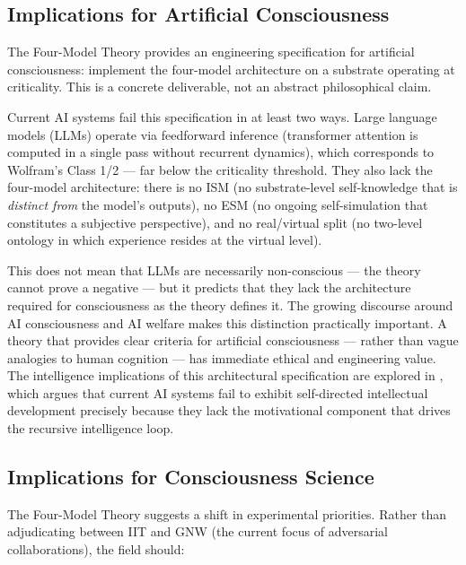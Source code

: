 \documentclass[12pt]{article}
\begin{document}
\subsection{Implications for Artificial Consciousness}


The Four-Model Theory provides an engineering specification for artificial consciousness: implement the four-model architecture on a substrate operating at criticality. This is a concrete deliverable, not an abstract philosophical claim.

Current AI systems fail this specification in at least two ways. Large language models (LLMs) operate via feedforward inference (transformer attention is computed in a single pass without recurrent dynamics), which corresponds to Wolfram's Class 1/2 --- far below the criticality threshold. They also lack the four-model architecture: there is no ISM (no substrate-level self-knowledge that is \emph{distinct from} the model's outputs), no ESM (no ongoing self-simulation that constitutes a subjective perspective), and no real/virtual split (no two-level ontology in which experience resides at the virtual level).

This does not mean that LLMs are necessarily non-conscious --- the theory cannot prove a negative --- but it predicts that they lack the architecture required for consciousness as the theory defines it. The growing discourse around AI consciousness \citep{Butlin2023,Butlin2025,Schwitzgebel2025,Birch2025} and AI welfare \citep{Long2024,Anthropic2025} makes this distinction practically important. A theory that provides clear criteria for artificial consciousness --- rather than vague analogies to human cognition --- has immediate ethical and engineering value. The intelligence implications of this architectural specification are explored in \citet{Gruber2026a}, which argues that current AI systems fail to exhibit self-directed intellectual development precisely because they lack the motivational component that drives the recursive intelligence loop.


\subsection{Implications for Consciousness Science}


The Four-Model Theory suggests a shift in experimental priorities. Rather than adjudicating between IIT and GNW (the current focus of adversarial collaborations), the field should:
\end{document}
